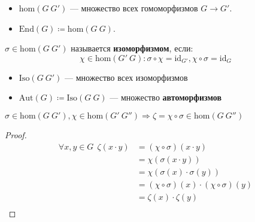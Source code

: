 \begin{obozn}\itemfix
    \begin{itemize}
        \item \(\mathrm{hom}(G\ G')\) --- множество всех гомоморфизмов \(G \to G'\).
        \item \(\mathrm{End}(G) \coloneqq \mathrm{hom}(G\ G)\).
    \end{itemize}
\end{obozn}

\begin{definition}
    \(\sigma \in \mathrm{hom}(G\ G')\) называется \textbf{изоморфизмом}, если:
    \[\chi \in \mathrm{hom}(G'\ G) : \sigma \circ \chi = \mathrm{id}_{G'}, \chi \circ \sigma = \mathrm{id}_G\]
\end{definition}

\begin{obozn}\itemfix
    \begin{itemize}
        \item \(\mathrm{Iso}(G\ G')\) --- множество всех изоморфизмов
        \item \(\mathrm{Aut}(G) \coloneqq \mathrm{Iso}(G\ G)\) --- множество \textbf{автоморфизмов}
    \end{itemize}
\end{obozn}

\begin{lemma}
    \(\sigma \in \mathrm{hom}(G\ G'), \chi \in \mathrm{hom}(G'\ G'') \Rightarrow \zeta = \chi \circ \sigma \in \mathrm{hom}(G\ G'')\)
\end{lemma}
\begin{proof}
    \begin{align*}
        \forall x, y \in G \ \ \zeta(x \cdot y) & = (\chi \circ \sigma) (x \cdot y)                      \\
                                                & = \chi(\sigma(x \cdot y))                              \\
                                                & = \chi(\sigma(x) \cdot \sigma(y))                      \\
                                                & = (\chi \circ \sigma) (x) \cdot (\chi \circ \sigma)(y) \\
                                                & = \zeta(x) \cdot \zeta(y)                              \\
    \end{align*}
\end{proof}

